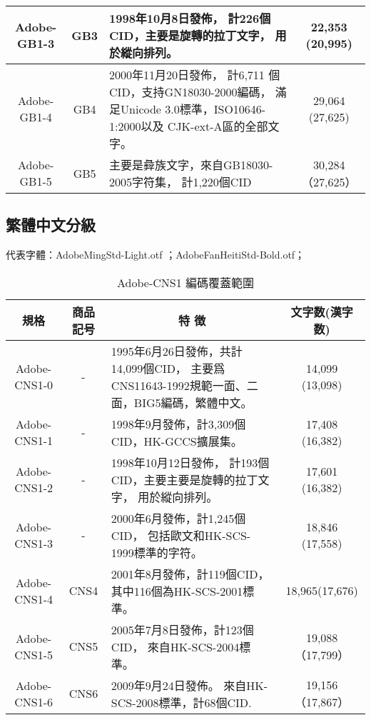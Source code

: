 \begin{appendix}
\begin{table}[h]
\begin{tabular}{|c|c|p{8cm}|c|}
Adobe-GB1-3	& GB3	&   1998年10月8日發佈，
計226個CID，主要是旋轉的拉丁文字，
用於縱向排列。 & 22,353 (20,995) \\

\hline
Adobe-GB1-4	& GB4 & 2000年11月20日發佈，
計6,711 個CID，支持GN18030-2000編碼，
滿足Unicode 3.0標準，ISO10646-1:2000以及 CJK-ext-A區的全部文字。
& 29,064 (27,625) \\
\hline
Adobe-GB1-5	& GB5 & 主要是彜族文字，來自GB18030-2005字符集，
計1,220個CID & 30,284（27,625） \\

\hline %
\end{tabular}

\end{table}


\subsection{繁體中文分級}
{\gtfamily 代表字體：AdobeMingStd-Light.otf ；AdobeFanHeitiStd-Bold.otf；}
\begin{table}[h]
\caption{\fontsize{12pt}{15pt}\selectfont Adobe-CNS1 編碼覆蓋範圍} %
\centering %
\begin{tabular}{|c|c|p{8cm}|c|}%
\hline  %

規格 & 商品記号	& \multicolumn{1}{|c|}{特 徴} & 文字数(漢字数) \\

\hline  %
Adobe-CNS1-0 &	-	 & 1995年6月26日發佈，共計14,099個CID，
主要爲CNS11643-1992規範一面、二面，BIG5編碼，繁體中文。
& 14,099 (13,098) \\
\hline
Adobe-CNS1-1	& - &	1998年9月發佈，計3,309個CID，HK-GCCS擴展集。
& 	17,408 (16,382) \\
\hline
Adobe-CNS1-2	& - &  1998年10月12日發佈，
計193個CID，主要主要是旋轉的拉丁文字，
用於縱向排列。 & 17,601 (16,382) \\
\hline

Adobe-CNS1-3	& -	&   2000年6月發佈，計1,245個CID，
包括歐文和HK-SCS-1999標準的字符。
&  18,846 (17,558) \\

\hline
Adobe-CNS1-4	& CNS4 & 2001年8月發佈，計119個CID，
其中116個為HK-SCS-2001標準。
& 18,965(17,676) \\
\hline
Adobe-CNS1-5	& CNS5 & 2005年7月8日發佈，計123個CID，
來自HK-SCS-2004標準。 & 19,088（17,799） \\
\hline
Adobe-CNS1-6	& CNS6 & 2009年9月24日發佈。
來自HK-SCS-2008標準，計68個CID. & 19,156（17,867） \\
\hline %
\end{tabular}

\end{table}

\end{appendix}